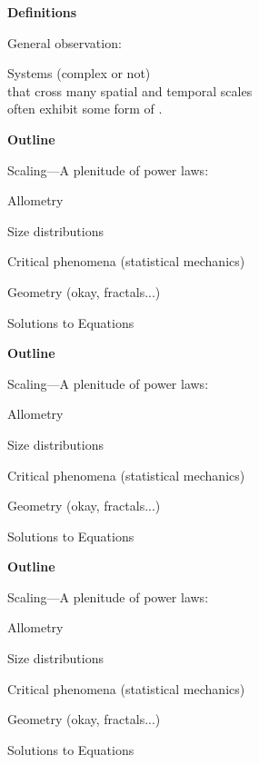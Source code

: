 


  \textbf{Definitions}

General observation:

Systems (complex or not) \\
that cross many spatial and temporal scales\\
often exhibit some form of .


  \textbf{Outline}

  {Scaling---A plenitude of power laws:}

  \inv

   Allometry

   Size distributions

   Critical phenomena {\small (statistical mechanics)}

   Geometry {\small (okay, fractals...)}

   Solutions to Equations


  \textbf{Outline}

  {Scaling---A plenitude of power laws:}

   Allometry

  \inv

   Size distributions

   Critical phenomena {\small (statistical mechanics)}

   Geometry {\small (okay, fractals...)}

   Solutions to Equations


  \textbf{Outline}

  {Scaling---A plenitude of power laws:}

   Allometry

   Size distributions

  \inv

   Critical phenomena {\small (statistical mechanics)}

   Geometry {\small (okay, fractals...)}

   Solutions to Equations


